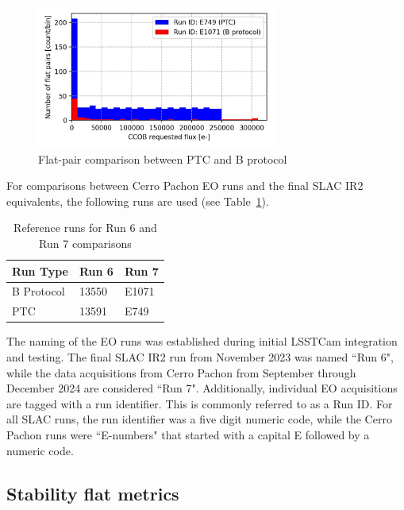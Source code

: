 \begin{figure}[ht]
\begin{centering}
\includegraphics[width=0.7\textwidth]{figures/baselineCharacterization/PTC_BProtocol_Comparison.jpg}
	\caption{Flat-pair comparison between PTC and B protocol
\label{fig:PTC_BProtocol_Comparison}}
\end{centering}
\end{figure}

For comparisons between Cerro Pachon EO runs and the final SLAC IR2 equivalents, the following runs are used (see Table~\ref{runTable-b-ptc}).

\begin{table}[ht]
\centering
\caption{Reference runs for Run 6 and Run 7 comparisons} \label{runTable-b-ptc}
\begin{tabular}{lll}
\toprule
Run Type & Run 6 & Run 7 \\
\midrule
B Protocol & 13550 & E1071 \\
PTC        & 13591 & E749 \\
\bottomrule
\end{tabular}
\end{table}

The naming of the EO runs was established during initial LSSTCam
integration and testing. The final SLAC IR2 run from November 2023 was
named ``Run 6", while the data acquisitions from Cerro Pachon from September through December 2024 are considered ``Run 7". Additionally, individual EO acquisitions are tagged with a run identifier. This is commonly referred to as a Run ID. For all SLAC runs, the run identifier was a five digit numeric code, while the Cerro Pachon runs were ``E-numbers" that started with a capital E followed by a numeric code.


\subsection{Stability flat metrics}\label{stability-flat-metrics}


